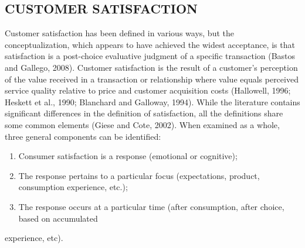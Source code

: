 \documentclass[a4paper, 12pt]{extarticle}
\begin{document}
{\subsection{CUSTOMER SATISFACTION}
\par Customer satisfaction has been defined in various ways, but the conceptualization, which appears to have achieved the widest acceptance, is that satisfaction is a post-choice evaluative judgment of a specific transaction (Bastos and Gallego, 2008). Customer satisfaction is the result of a customer's perception of the value received in a transaction or relationship where value equals perceived service quality relative to price and customer acquisition costs (Hallowell, 1996; Heskett et al., 1990; Blanchard and Galloway, 1994). While the literature contains significant differences in the definition of satisfaction, all the definitions share some common elements (Giese and Cote, 2002). When examined as a whole, three general components can be identified:
\begin{enumerate}
\item Consumer satisfaction is a response (emotional or cognitive);
\item The response pertains to a particular focus (expectations, product, consumption experience, etc.);
\item The response occurs at a particular time (after consumption, after choice, based on accumulated
\end{enumerate}
experience, etc).
}
\end{document}

